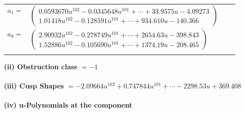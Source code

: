 \documentclass[1p]{elsarticle_modified}
\theoremstyle{definition}
\begin{document}
\begin{tabular}{m{7pt} m{180pt} m{7pt} m{180pt} }
\flushright $a_{1}=$&$\begin{pmatrix}0.0593670 u^{102}-0.0345648 u^{101}+\cdots+33.9575 u-4.09273\\1.01418 u^{102}-0.128591 u^{101}+\cdots+934.610 u-140.366\end{pmatrix}$ \\
\flushright $a_{8}=$&$\begin{pmatrix}2.90932 u^{102}-0.278749 u^{101}+\cdots+2654.63 u-398.843\\1.52886 u^{102}-0.105690 u^{101}+\cdots+1374.19 u-208.465\end{pmatrix}$\\&\end{tabular}
\flushleft \textbf{(ii) Obstruction class $= -1$}\\~\\
\flushleft \textbf{(iii) Cusp Shapes $= -2.09664 u^{102}+0.747844 u^{101}+\cdots-2298.53 u+369.408$}\\~\\
\newpage\renewcommand{\arraystretch}{1}
\flushleft \textbf{(iv) u-Polynomials at the component}\newline \\
\end{document}
